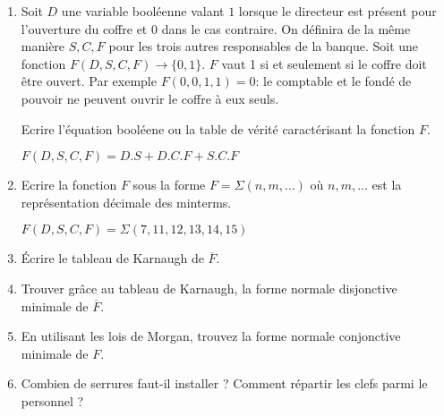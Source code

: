 \documentclass[a4paper,10pt]{exam}
\begin{document}
\begin{enumerate}
\item
  Soit $D$ une variable booléenne valant $1$ lorsque le directeur est
  présent pour l'ouverture du coffre et $0$ dans le cas contraire.  On définira
  de la même manière $S,C,F$ pour les trois autres responsables de la banque.
  Soit une fonction $F(D,S,C,F) \rightarrow \{0,1\}$. $F$ vaut 1 si et seulement
  si le coffre doit être ouvert. Par exemple $F(0,0,1,1) = 0$: le comptable
  et le fondé de pouvoir ne peuvent ouvrir le coffre à eux seuls.

 Ecrire l'équation booléene ou la table de vérité caractérisant la fonction $F$.
\begin{solution}
  $F(D,S,C,F) = D.S + D.C.F + S.C.F$
\end{solution}

\item Ecrire la fonction $F$ sous la forme $F = \Sigma(n,m,\dots)$ où $n,m,\dots$
  est la représentation décimale des minterms.
\begin{solution}
  $F(D,S,C,F) = \Sigma(7,11,12,13,14,15)$
\end{solution}

\item Écrire le tableau de Karnaugh de $\overline{F}$.
\item Trouver grâce au tableau de Karnaugh, la forme normale disjonctive
  minimale de $\overline{F}$.
\item En utilisant les lois de Morgan, trouvez la forme normale conjonctive
  minimale de $F$.
\item Combien de serrures faut-il installer ? Comment répartir les clefs parmi
  le personnel ?
\begin{solution}

  \begin{center}
\end{center}
\end{solution}
\end{enumerate}
\end{document}
